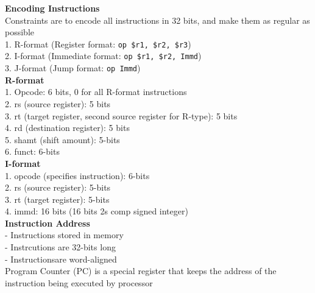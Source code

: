 \documentclass[10pt, a4paper]{article}
\begin{document}
\begin{multicols*}{3}
		\textbf{Encoding Instructions}\\
		Constraints are to encode all instructions in 32 bits, and make them as regular as possible\\
		1. R-format (Register format: \texttt{op \$r1, \$r2, \$r3})\\
		2. I-format (Immediate format: \texttt{op \$r1, \$r2, Immd})\\
		3. J-format (Jump format: \texttt{op Immd})\\
		
		\textbf{R-format}\\
		1. Opcode: 6 bits, 0 for all R-format instructions\\
		2. rs (source register): 5 bits\\
		3. rt (target register, second source register for R-type): 5 bits\\
		4. rd (destination register): 5 bits\\		
		5. shamt (shift amount): 5-bits\\
		6. funct: 6-bits\\
		
		\textbf{I-format}\\
		1. opcode (specifies instruction): 6-bits\\
		2. rs (source register): 5-bits\\
		3. rt (target register): 5-bits\\
		4. immd: 16 bits (16 bits 2s comp signed integer)\\
		
		\textbf{Instruction Address}\\
		- Instructions stored in memory\\
		- Instrcutions are 32-bits long\\
		- Instructionsare word-aligned\\
		Program Counter (PC) is a special register that keeps the address of the instruction being executed by processor\\
		

\end{multicols*}
\end{document}
